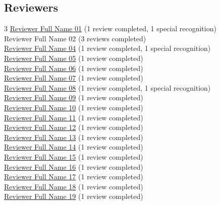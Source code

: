 \subsection{Reviewers}
\begin{multicols}{3}
\href{https://orcid.org/0000-0001-2345-6789}{Reviewer Full Name 01} (1 review completed, 1 special recognition)\\
Reviewer Full Name 02 (3 reviews completed)\\
\href{https://orcid.org/0000-0001-2345-6789}{Reviewer Full Name 04} (1 review completed, 1 special recognition)\\
\href{https://orcid.org/0000-0001-2345-6789}{Reviewer Full Name 05} (1 review completed)\\
\href{https://orcid.org/0000-0001-2345-6789}{Reviewer Full Name 06} (1 review completed)\\
\href{https://orcid.org/0000-0001-2345-6789}{Reviewer Full Name 07} (1 review completed)\\
\href{https://orcid.org/0000-0001-2345-6789}{Reviewer Full Name 08} (1 review completed, 1 special recognition)\\
\href{https://orcid.org/0000-0001-2345-6789}{Reviewer Full Name 09} (1 review completed)\\
\href{https://orcid.org/0000-0001-2345-6789}{Reviewer Full Name 10} (1 review completed)\\
\href{https://orcid.org/0000-0001-2345-6789}{Reviewer Full Name 11} (1 review completed)\\
\href{https://orcid.org/0000-0001-2345-6789}{Reviewer Full Name 12} (1 review completed)\\
\href{https://orcid.org/0000-0001-2345-6789}{Reviewer Full Name 13} (1 review completed)\\
\href{https://orcid.org/0000-0001-2345-6789}{Reviewer Full Name 14} (1 review completed)\\
\href{https://orcid.org/0000-0001-2345-6789}{Reviewer Full Name 15} (1 review completed)\\
\href{https://orcid.org/0000-0001-2345-6789}{Reviewer Full Name 16} (1 review completed)\\
\href{https://orcid.org/0000-0001-2345-6789}{Reviewer Full Name 17} (1 review completed)\\
\href{https://orcid.org/0000-0001-2345-6789}{Reviewer Full Name 18} (1 review completed)\\
\href{https://orcid.org/0000-0001-2345-6789}{Reviewer Full Name 19} (1 review completed)\\

\end{multicols}
